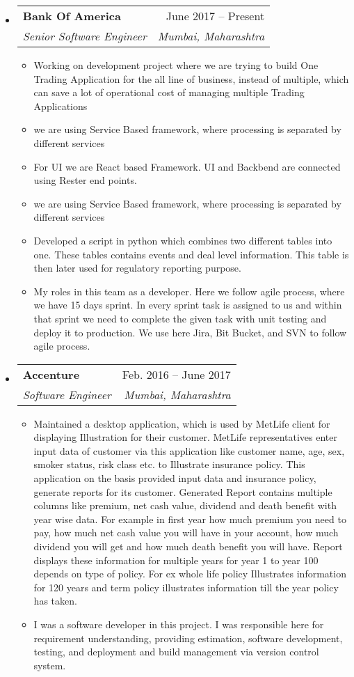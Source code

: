 \documentclass[letterpaper,12pt]{article}[leftmargin=*]
\makeatletter
\def \entryspacing {-0pt}
\newcommand{\resumeEntryStart}{\begin{itemize}[leftmargin=2.5mm]}
\newcommand{\resumeEntryEnd}{\end{itemize}\vspace{\entryspacing}}
\newcommand{\resumeItemListStart}{\begin{itemize}[leftmargin=4.5mm]}
\newcommand{\resumeItemListEnd}{\end{itemize}}
\newcommand{\resumeItem}[1]{
  \item\small{
    {#1 \vspace{-2pt}}
  }
}
\newcommand{\resumeEntryTSDL}[4]{
  \vspace{-1pt}\item[]
    \begin{tabular*}{0.97\textwidth}{l@{\extracolsep{\fill}}r}
      \textbf{\color{primary}#1} & {\firabook\color{accent}\small#2} \\
      \textit{\color{accent}\small#3} & \textit{\color{accent}\small#4} \\
    \end{tabular*}\vspace{-6pt}
}
\makeatother
\begin{document}
  \resumeEntryStart
    \resumeEntryTSDL
      {Bank Of America}{June 2017 -- Present}
      {Senior Software Engineer}{Mumbai, Maharashtra}
    \resumeItemListStart
      \resumeItem {Working on development project where we are trying to build One Trading Application for the all line of business, instead of multiple, which can save a lot of operational cost of managing multiple Trading Applications}
      \resumeItem {we are using Service Based framework, where processing is separated by different services}
      \resumeItem {For UI we are React based Framework. UI and Backbend are connected using Rester end points.}
      \resumeItem {we are using Service Based framework, where processing is separated by different services}
      \resumeItem {Developed a script in python which combines two different tables into one. These tables contains events and deal level information. This table is then later used for regulatory reporting purpose.}     
      \resumeItem {My roles in this team as a developer. Here we follow agile process, where we have 15 days sprint. In every sprint task is assigned to us and within that sprint we need to complete the given task with unit testing and deploy it to production. We use here Jira, Bit Bucket, and SVN to follow agile process.}
    \resumeItemListEnd
  \resumeEntryEnd

  \resumeEntryStart
    \resumeEntryTSDL
      {Accenture}{Feb. 2016 -- June 2017}
      {Software Engineer}{Mumbai, Maharashtra}
    \resumeItemListStart
      \resumeItem {Maintained a desktop application, which is used by MetLife client for displaying Illustration for their customer. MetLife representatives enter input data of customer via this application like customer name, age, sex, smoker status, risk class etc. to Illustrate insurance policy. This application on the basis provided input data and insurance policy, generate reports for its customer. Generated Report contains multiple columns like premium, net cash value, dividend and death benefit with year wise data. For example in first year how much premium you need to pay, how much net cash value you will have in your account, how much dividend you will get and how much death benefit you will have. Report displays these information for multiple years for year 1 to year 100 depends on type of policy. For ex whole life policy Illustrates information for 120 years and term policy illustrates information till the year policy has taken.}
      \resumeItem {I was a software developer in this project. I was responsible here for requirement understanding, providing estimation, software development, testing, and deployment and build management via version control system.}
    \resumeItemListEnd
  \resumeEntryEnd
\end{document}
